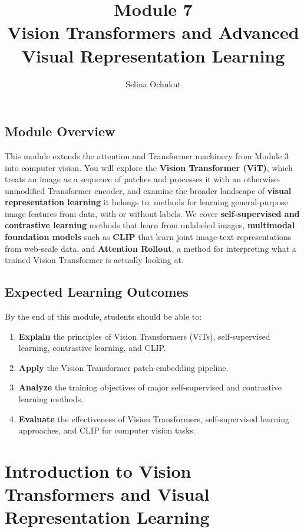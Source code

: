 \documentclass[12pt,a4paper]{article}
\title{\color{moduleblue}\Huge \textbf{Module 7}\\[0.3em]
\Large Vision Transformers and Advanced Visual Representation Learning}
\author{Selina Ochukut}
\date{}
\begin{document}
\maketitle

\begin{tcolorbox}[colback=moduleblue!6, colframe=moduleblue, arc=2mm, boxrule=1pt]
\subsection*{Module Overview}
This module extends the attention and Transformer machinery from Module 3 into computer vision. You will explore the \textbf{Vision Transformer (ViT)}, which treats an image as a sequence of patches and processes it with an otherwise-unmodified Transformer encoder, and examine the broader landscape of \textbf{visual representation learning} it belongs to: methods for learning general-purpose image features from data, with or without labels. We cover \textbf{self-supervised and contrastive learning} methods that learn from unlabeled images, \textbf{multimodal foundation models} such as \textbf{CLIP} that learn joint image-text representations from web-scale data, and \textbf{Attention Rollout}, a method for interpreting what a trained Vision Transformer is actually looking at. 
\end{tcolorbox}

\subsection*{Expected Learning Outcomes}

By the end of this module, students should be able to:
\begin{enumerate}
    \item \textbf{Explain} the principles of Vision Transformers (ViTs), self-supervised learning, contrastive learning, and CLIP.
    \item \textbf{Apply} the Vision Transformer patch-embedding pipeline.
    \item \textbf{Analyze} the training objectives of major self-supervised and contrastive learning methods.
    \item \textbf{Evaluate} the effectiveness of Vision Transformers, self-supervised learning approaches, and CLIP for computer vision tasks.
\end{enumerate}

\newpage

\section{Introduction to Vision Transformers and Visual Representation Learning}
\end{document}
